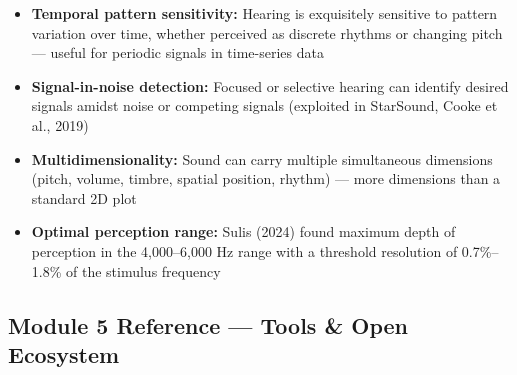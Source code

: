 \documentclass[11pt,letterpaper]{article}
\begin{document}
\begin{itemize}
  \item \textbf{Temporal pattern sensitivity:} Hearing is exquisitely sensitive to pattern variation over time, whether perceived as discrete rhythms or changing pitch — useful for periodic signals in time-series data
  \item \textbf{Signal-in-noise detection:} Focused or selective hearing can identify desired signals amidst noise or competing signals (exploited in StarSound, Cooke et al., 2019)
  \item \textbf{Multidimensionality:} Sound can carry multiple simultaneous dimensions (pitch, volume, timbre, spatial position, rhythm) — more dimensions than a standard 2D plot
  \item \textbf{Optimal perception range:} Sulis (2024) found maximum depth of perception in the 4,000--6,000 Hz range with a threshold resolution of 0.7\%--1.8\% of the stimulus frequency
\end{itemize}

\subsection{Module 5 Reference — Tools \& Open Ecosystem}
\end{document}
